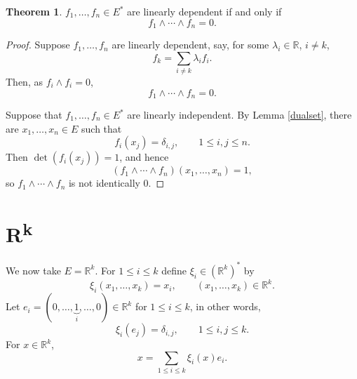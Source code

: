 \documentclass{article}
\theoremstyle{definition}
\newtheorem{theorem}{Theorem}
\theoremstyle{definition}
\begin{document}
\begin{theorem}
$f_1,\ldots,f_n \in E^*$ are linearly dependent if and only if 
\[
f_1 \wedge \cdots \wedge f_n=0.
\]
\end{theorem}
\begin{proof}
Suppose $f_1,\ldots,f_n$ are linearly dependent, say, for some
$\lambda_i \in \mathbb{R}$, $i \neq k$,
\[
f_k = \sum_{i \neq k} \lambda_i f_i.
\]
Then, as $f_i \wedge f_i =0$,
\[
f_1 \wedge \cdots \wedge f_n = 0.
\]

Suppose
that $f_1,\ldots,f_n \in E^*$ are linearly independent. 
By Lemma \ref{dualset},
there are $x_1,\ldots,x_n \in E$ such that 
\[
f_i(x_j) = \delta_{i,j},\qquad 1 \leq i, j \leq n.
\]
Then $\det (f_i(x_j)) = 1$, and hence 
\[
(f_1 \wedge \cdots \wedge f_n)(x_1,\ldots,x_n) = 1,
\]
so $f_1 \wedge \cdots \wedge f_n$ is not identically $0$.
\end{proof}





\section{\textbf{R}\textsuperscript{k}}
We now take $E=\mathbb{R}^k$.
For $1 \leq i \leq k$ define $\xi_i \in (\mathbb{R}^k)^*$ by
\[
\xi_i(x_1,\ldots,x_k) = x_i,\qquad (x_1,\ldots,x_k) \in \mathbb{R}^k.
\]
Let $e_i = (0,\ldots,\underbrace{1}_i,\ldots,0) \in \mathbb{R}^k$ for $1 \leq i \leq k$, in other words,
\[
\xi_i(e_j) = \delta_{i,j},\qquad 1 \leq i,j \leq k.
\]  
For $x \in \mathbb{R}^k$,
\[
x = \sum_{1 \leq i \leq k} \xi_i(x)e_i.
\]
\end{document}
